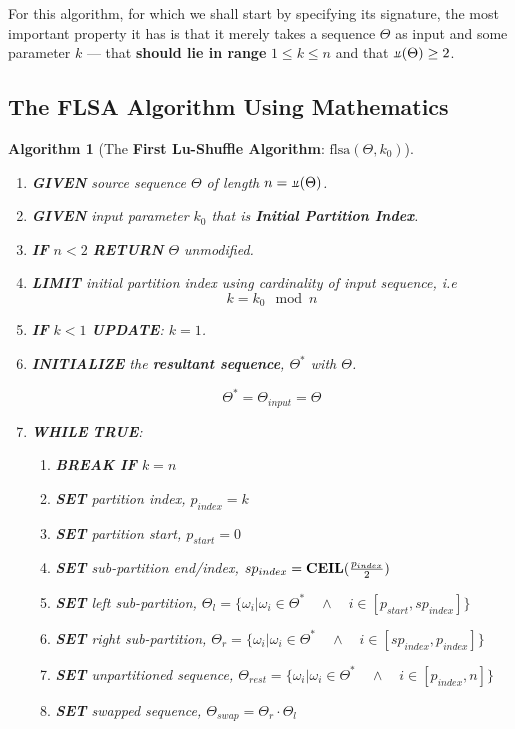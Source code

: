 \documentclass[a4paper, 18pt]{book} %
\newtheorem{alg}{Algorithm}
\newcommand{\invpi}{\rotatebox[origin=c]{180}{$\pi$}}
\begin{document}
For this algorithm, for which we shall start by specifying its signature, the most important property it has is that it merely takes a sequence $\Theta$ as input and some parameter $k$ --- that \textbf{should lie in range} $1 \leq k \leq n$ and that $\invpi(\Theta) \geq 2$.

\subsection{The FLSA Algorithm Using Mathematics}

\begin{alg}[The \textbf{First Lu-Shuffle Algorithm}: $\text{flsa}(\Theta, k_0)$]
\label{ALGLUSHUFFLEA}
$ $\\
\begin{enumerate}
\item \textbf{GIVEN} source sequence $\Theta$ of length $n = \invpi(\Theta)$.
\item  \textbf{GIVEN} input parameter $k_0$ that is \textbf{Initial Partition Index}.
\item \textbf{IF} $n < 2$ \textbf{RETURN} $\Theta$ unmodified.
\item {\textbf{LIMIT} initial partition index using cardinality of input sequence, i.e
\begin{equation}
k = k_0 \mod n
\end{equation}
}
\item \textbf{IF} $k < 1$ \textbf{UPDATE}: $k = 1$.
\item{  \textbf{INITIALIZE} the \textbf{resultant sequence}, $\Theta^*$ with $\Theta$.

		\begin{equation}
		\Theta^* = \Theta_{input} = \Theta
		\end{equation}
}
\item { \textbf{WHILE} \textbf{TRUE}:
\begin{enumerate}
	\item \textbf{BREAK IF} $k = n$
	\item \textbf{SET} partition index, $p_{index} = k$
	\item \textbf{SET} partition start, $p_{start} = 0$
	\item \textbf{SET} sub-partition end/index, $sp_{index} = \text{\textbf{CEIL}}(\frac{p_{index}}{2})$
	\item \textbf{SET} left sub-partition, $\Theta_{l} = \{\omega_i | \omega_i \in \Theta^* \quad \land \quad i \in [p_{start},sp_{index}]\}$
	\item \textbf{SET} right sub-partition, $\Theta_{r} = \{\omega_i | \omega_i \in \Theta^* \quad \land \quad i \in [sp_{index},p_{index}]\}$
	\item \textbf{SET} unpartitioned sequence, $\Theta_{rest} = \{\omega_i | \omega_i \in \Theta^* \quad \land \quad i \in [p_{index},n]\}$
	\item \textbf{SET} swapped sequence, $\Theta_{swap} = \Theta_{r} \cdot \Theta_{l}$ 
	

\end{enumerate}}
\end{enumerate}
\end{alg}
\end{document}
